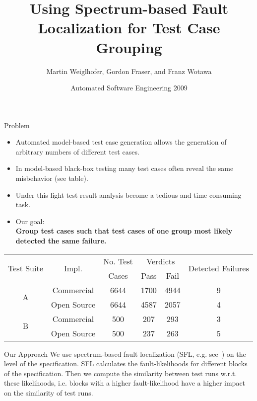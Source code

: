 \documentclass[final,hyperref={pdfpagelabels=false}]{beamer}
\institute[Institute for Software Technology] 
{
  Institute for Software Technology - Graz University of Technology
}
\date[ASE 2009] 
{Automated Software Engineering 2009}
\title{Using Spectrum-based Fault Localization for Test Case Grouping}
\author[Weiglhofer, Fraser \& Wotawa]{Martin Weiglhofer, Gordon
  Fraser, and Franz Wotawa}
\begin{document}
\begin{frame}

\centering
\begin{block}{Problem}

\begin{minipage}{0.64\paperwidth}
\begin{itemize}
  \item Automated model-based test case generation allows the generation
    of arbitrary numbers of different test cases.
  \item In model-based black-box testing many test cases often reveal
    the same misbehavior (see table).
  \item Under this light test result analysis become a tedious and time
    consuming task. 
  \item Our goal: \\\textbf{ Group test cases such that test cases of
      one group most likely detected the same failure.}
\end{itemize}
\end{minipage}
\qquad
\begin{minipage}{0.29\paperwidth}
\begin{center}
  \begin{tabular}{cccccc}
    \toprule
    \multirow{2}{2.3cm}{Test Suite} & \multirow{2}{*}{Impl.} & No. Test &
    \multicolumn{2}{c}{Verdicts} & \multirow{2}{4cm}{\centering Detected Failures} \\
\cmidrule{4-5}
                                &                        & Cases    &      Pass & Fail \\
    \midrule
    \multirow{2}{*}{A} & Commercial  & 6644 & 1700 & \cellcolor{tugorange} 4944 & \cellcolor{tugorange} 9 \\
                       & Open Source & 6644 & 4587 & \cellcolor{tugorange} 2057 & \cellcolor{tugorange} 4 \\
    \multirow{2}{*}{B} & Commercial  &  500 &  207 & \cellcolor{tugorange} 293  & \cellcolor{tugorange} 3 \\
                       & Open Source &  500 &  237 & \cellcolor{tugorange} 263  & \cellcolor{tugorange} 5 \\
    \bottomrule
  \end{tabular}
\end{center}
\end{minipage}

\end{block}

\begin{block}{Our Approach}
  We use spectrum-based fault localization (SFL,
  e.g. see~\cite{abreu2007accuracy}) on the level of the
  specification. SFL calculates the fault-likelihoods for different
  blocks of the specification. Then we compute the similarity between
  test runs w.r.t. these likelihoods, i.e. blocks with a higher
  fault-likelihood have a higher impact on the similarity of test
  runs.


\end{block}
\end{frame}
\end{document}
